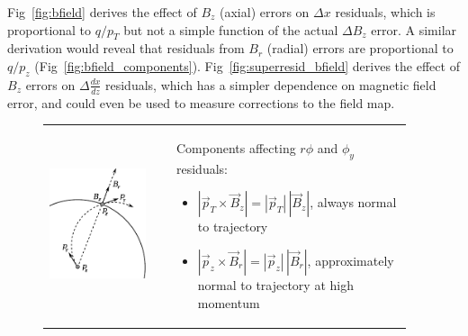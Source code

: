 \documentclass[12pt]{article}
\begin{document}
Fig~\ref{fig:bfield} derives the effect of $B_z$ (axial) errors on
$\Delta x$ residuals, which is proportional to $q/p_T$ but not a
simple function of the actual $\Delta B_z$ error.  A similar
derivation would reveal that residuals from $B_r$ (radial) errors are
proportional to $q/p_z$ (Fig~\ref{fig:bfield_components}).
Fig~\ref{fig:superresid_bfield} derives the effect of $B_z$ errors on
$\Delta \frac{dx}{dz}$ residuals, which has a simpler dependence on
magnetic field error, and could even be used to measure corrections to
the field map.

\begin{figure}
\begin{center}
\begin{tabular}{p{0.3\linewidth} c p{0.65\linewidth}}
\includegraphics[width=\linewidth]{bfield_components.pdf} & \hspace{0.5 cm} &
\begin{minipage}{\linewidth}
\vspace{-4.5 cm}
\noindent Components affecting $r\phi$ and $\phi_y$ residuals:
\begin{itemize}
\item $|\vec{p}_T \times \vec{B}_z| = |\vec{p}_T| \, |\vec{B}_z|$, always normal to trajectory
\item $|\vec{p}_z \times \vec{B}_r| = |\vec{p}_z| \, |\vec{B}_r|$, approximately normal to trajectory at high momentum
\end{itemize}


\end{minipage}
\end{tabular}
\end{center}
\end{figure}
\end{document}
